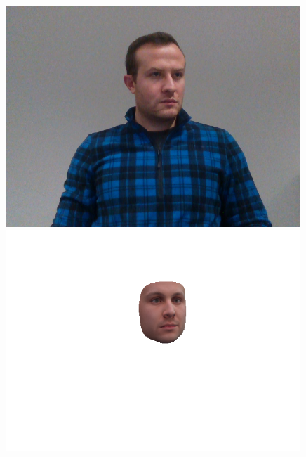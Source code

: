 \begin{figure}[h]
    \begin{minipage}{.325\textwidth}
      \centering
      \includegraphics[width=0.99\textwidth]{Figures/dataset/target/4.png}
    \end{minipage}
    \begin{minipage}{.325\textwidth}
      \centering
      \includegraphics[width=0.99\textwidth]{Figures/dataset/our/4.png}
    \end{minipage}
    \begin{minipage}{.325\textwidth}
      \centering

\end{minipage}
\end{figure}
